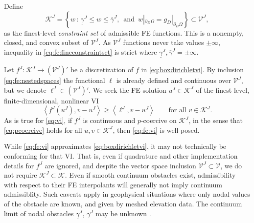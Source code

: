 \documentclass[letterpaper,final,12pt,reqno]{amsart}
\theoremstyle{cstyle}
\theoremstyle{cstyle*}
\theoremstyle{dstyle}
\numberwithin{equation}{section}
\numberwithin{figure}{section}
\numberwithin{table}{section}
\numberwithin{theorem}{section}
\newcommand{\cK}{\mathcal{K}}
\newcommand{\ip}[2]{\left<#1,#2\right>}
\begin{document}
Define
\begin{equation}
\mathcal{K}^J = \left\{w\,:\,\underline{\gamma}^J \le w \le \overline{\gamma}^J, \, \text{ and } \, w|_{\partial_D\Omega} = g_D|_{\partial_D\Omega}\right\} \subset \mathcal{V}^J, \label{eq:fe:fineconstraintset}
\end{equation}
as the finest-level \emph{constraint set} of admissible FE functions.  This is a nonempty, closed, and convex subset of $\mathcal{V}^J$.  As $\mathcal{V}^J$ functions never take values $\pm\infty$, inequality in \eqref{eq:fe:fineconstraintset} is strict where $\underline{\gamma}^J, \overline{\gamma}^J = \pm \infty$.

Let $f^J:\mathcal{K}^J \to (\mathcal{V}^J)'$ be a discretization of $f$ in \eqref{eq:boxdirichletvi}.  By inclusion \eqref{eq:fe:nestedspaces} the functional $\ell$ is already defined and continuous over $\mathcal{V}^J$, but we denote $\ell^J \in (\mathcal{V}^J)'$.  We seek the FE solution $u^J \in \mathcal{K}^J$ of the finest-level, finite-dimensional, nonlinear VI
\begin{equation}
\ip{f^J(u^J)}{v-u^J} \ge \ip{\ell^J}{v-u^J} \qquad \text{for all } v\in \cK^J. \label{eq:fe:vi}
\end{equation}
As is true for \eqref{eq:vi}, if $f^J$ is continuous and $p$-coercive on $\mathcal{K}^J$, in the sense that \eqref{eq:pcoercive} holds for all $u,v \in \mathcal{K}^J$, then \eqref{eq:fe:vi} is well-posed.

While \eqref{eq:fe:vi} approximates \eqref{eq:boxdirichletvi}, it may not technically be conforming for that VI.  That is, even if quadrature and other implementation details for $f^J$ are ignored, and despite the vector space inclusion $\mathcal{V}^J \subset \mathcal{V}$, we do not require $\mathcal{K}^J \subset \mathcal{K}$.  Even if smooth continuum obstacles exist, admissibility with respect to their FE interpolants will generally not imply continuum admissiblity.  Such caveats apply in geophysical situations where only nodal values of the obstacle are known, and given by meshed elevation data.  The continuum limit of nodal obstacles $\underline{\gamma}^J$, $\overline{\gamma}^J$ may be unknown \cite{Bueler2016}.
\end{document}
